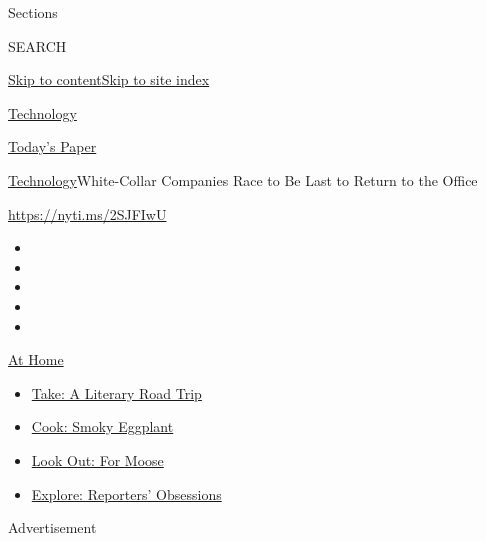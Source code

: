 Sections

SEARCH

\protect\hyperlink{site-content}{Skip to
content}\protect\hyperlink{site-index}{Skip to site index}

\href{https://www.nytimes.com/section/technology}{Technology}

\href{https://myaccount.nytimes.com/auth/login?response_type=cookie\&client_id=vi}{}

\href{https://www.nytimes.com/section/todayspaper}{Today's Paper}

\href{/section/technology}{Technology}\textbar{}White-Collar Companies
Race to Be Last to Return to the Office

\url{https://nyti.ms/2SJFIwU}

\begin{itemize}
\item
\item
\item
\item
\item
\end{itemize}

\href{https://www.nytimes.com/spotlight/at-home?action=click\&pgtype=Article\&state=default\&region=TOP_BANNER\&context=at_home_menu}{At
Home}

\begin{itemize}
\tightlist
\item
  \href{https://www.nytimes.com/2020/07/28/books/time-for-a-literary-road-trip.html?action=click\&pgtype=Article\&state=default\&region=TOP_BANNER\&context=at_home_menu}{Take:
  A Literary Road Trip}
\item
  \href{https://www.nytimes.com/2020/07/29/magazine/bored-with-your-home-cooking-some-smoky-eggplant-will-fix-that.html?action=click\&pgtype=Article\&state=default\&region=TOP_BANNER\&context=at_home_menu}{Cook:
  Smoky Eggplant}
\item
  \href{https://www.nytimes.com/2020/07/27/travel/moose-michigan-isle-royale.html?action=click\&pgtype=Article\&state=default\&region=TOP_BANNER\&context=at_home_menu}{Look
  Out: For Moose}
\item
  \href{https://www.nytimes.com/interactive/2020/at-home/even-more-reporters-editors-diaries-lists-recommendations.html?action=click\&pgtype=Article\&state=default\&region=TOP_BANNER\&context=at_home_menu}{Explore:
  Reporters' Obsessions}
\end{itemize}

Advertisement

